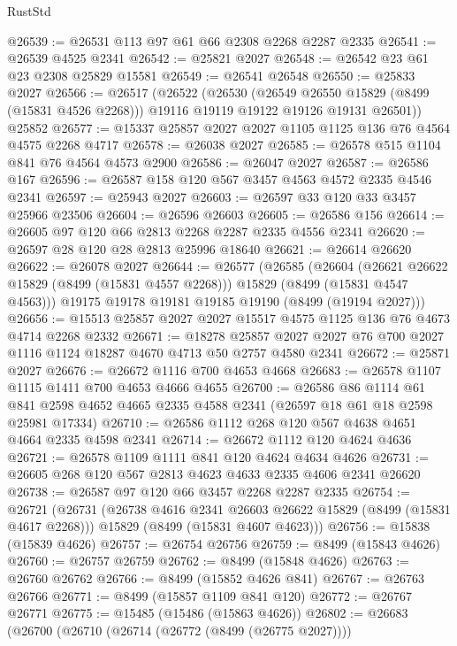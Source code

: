 \begin{lexlean}{RustStd}
\begin{coremodule}
@26539 := @26531 @113 @97 @61 @66 @2308 @2268 @2287 @2335
@26541 := @26539 @4525 @2341
@26542 := @25821 @2027
@26548 := @26542 @23 @61 @23 @2308 @25829 @15581
@26549 := @26541 @26548
@26550 := @25833 @2027
@26566 := @26517
    (@26522
      (@26530
        (@26549 @26550 @15829 (@8499 (@15831 @4526 @2268)))
        @19116
        @19119
        @19122
        @19126
        @19131
        @26501))
    @25852
@26577 := @15337 @25857 @2027 @2027 @1105 @1125 @136 @76 @4564 @4575 @2268 @4717
@26578 := @26038 @2027
@26585 := @26578 @515 @1104 @841 @76 @4564 @4573 @2900
@26586 := @26047 @2027
@26587 := @26586 @167
@26596 := @26587 @158 @120 @567 @3457 @4563 @4572 @2335 @4546 @2341
@26597 := @25943 @2027
@26603 := @26597 @33 @120 @33 @3457 @25966 @23506
@26604 := @26596 @26603
@26605 := @26586 @156
@26614 := @26605 @97 @120 @66 @2813 @2268 @2287 @2335 @4556 @2341
@26620 := @26597 @28 @120 @28 @2813 @25996 @18640
@26621 := @26614 @26620
@26622 := @26078 @2027
@26644 := @26577
    (@26585
      (@26604
        (@26621 @26622 @15829 (@8499 (@15831 @4557 @2268)))
        @15829
        (@8499 (@15831 @4547 @4563)))
      @19175
      @19178
      @19181
      @19185
      @19190
      (@8499 (@19194 @2027)))
@26656 := @15513 @25857 @2027 @2027 @15517 @4575 @1125 @136 @76 @4673 @4714 @2268 @2332
@26671 := @18278
    @25857
    @2027
    @2027
    @76
    @700
    @2027
    @1116
    @1124
    @18287
    @4670
    @4713
    @50
    @2757
    @4580
    @2341
@26672 := @25871 @2027
@26676 := @26672 @1116 @700 @4653 @4668
@26683 := @26578 @1107 @1115 @1411 @700 @4653 @4666 @4655
@26700 := @26586
    @86
    @1114
    @61
    @841
    @2598
    @4652
    @4665
    @2335
    @4588
    @2341
    (@26597 @18 @61 @18 @2598 @25981 @17334)
@26710 := @26586 @1112 @268 @120 @567 @4638 @4651 @4664 @2335 @4598 @2341
@26714 := @26672 @1112 @120 @4624 @4636
@26721 := @26578 @1109 @1111 @841 @120 @4624 @4634 @4626
@26731 := @26605 @268 @120 @567 @2813 @4623 @4633 @2335 @4606 @2341 @26620
@26738 := @26587 @97 @120 @66 @3457 @2268 @2287 @2335
@26754 := @26721
    (@26731
      (@26738 @4616 @2341 @26603 @26622 @15829 (@8499 (@15831 @4617 @2268)))
      @15829
      (@8499 (@15831 @4607 @4623)))
@26756 := @15838 (@15839 @4626)
@26757 := @26754 @26756
@26759 := @8499 (@15843 @4626)
@26760 := @26757 @26759
@26762 := @8499 (@15848 @4626)
@26763 := @26760 @26762
@26766 := @8499 (@15852 @4626 @841)
@26767 := @26763 @26766
@26771 := @8499 (@15857 @1109 @841 @120)
@26772 := @26767 @26771
@26775 := @15485 (@15486 (@15863 @4626))
@26802 := @26683
    (@26700
      (@26710
        (@26714 (@26772 (@8499 (@26775 @2027))))

\end{coremodule}
\end{lexlean}
